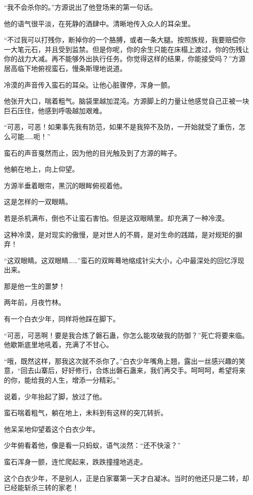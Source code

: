 \begin{this_body}
“我不会杀你的。”方源说出了他登场来的第一句话。

他的语气很平淡，在死静的酒肆中。清晰地传入众人的耳朵里。

“不过我可以打残你，断掉你的一个胳膊，或者一条大腿。按照族规，我要赔偿你一大笔元石，并且受到监禁。但是你呢，你的余生只能在床榻上渡过，你的伤残让你的战力大减。再不能够外出执行任务。你觉得这样的结果，你能接受吗？”方源居高临下地俯视蛮石，慢条斯理地说道。

冷漠的声音传入蛮石的耳朵。让他心脏骤停，浑身一颤。

他张开大口，喘着粗气。脑袋里越加混沌。方源脚上的力量让他感觉自己正被一块巨石压住，他感到呼吸越加艰难。

“可恶，可恶！如果事先我有防范，如果不是我猝不及防，一开始就受了重伤，怎么可能……呃！”

蛮石的声音戛然而止，因为他的目光触及到了方源的眸子。

他躺在地上，向上仰望。

方源半垂着眼帘，黑沉的眼眸俯视着他。

这是怎样的一双眼睛。

若是杀机满布，倒也不让蛮石害怕。但是这双眼睛里。却充满了一种冷漠。

这种冷漠，是对现实的傲慢，是对世人的不屑，是对生命的践踏，是对规矩的摒弃！

“这双眼睛。这双眼睛……”蛮石的双眸蓦地缩成针尖大小，心中最深处的回忆浮现出来。

那是他一生的噩梦！

两年前，月夜竹林。

有一个白衣少年，同样将他踩在脚下。

“可恶，可恶啊！要是我合炼了磐石蛊，你怎么能攻破我的防御？”死亡将要来临。他歇斯底里地吼着，充满了不甘心。

“哦，既然这样，那我这次就不杀你了。”白衣少年嘴角上翘，露出一丝感兴趣的笑意，“回去山寨后，好好修行，合炼出磐石蛊来，我们再交手。呵呵呵，希望将来的你，能给我的人生，增添一分精彩。”

说着，少年抬起了脚，放过了他。

蛮石喘着粗气，躺在地上，未料到有这样的突兀转折。

他呆呆地仰望着这个白衣少年。

少年俯看着他，像是看一只蚂蚁，语气淡然：“还不快滚？”

蛮石浑身一颤，连忙爬起来，跌跌撞撞地逃走。

这个白衣少年，不是别人，正是白家寨第一天才白凝冰。当时的他还只是二转，却已经能斩杀三转的家老！


\end{this_body}
